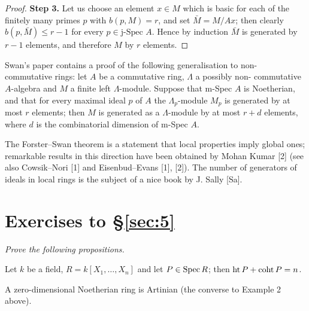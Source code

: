 \begin{proof}
\textbf{Step 3.} Let us choose an element $x \in M$ which is basic for each of the
finitely many primes $p$ with $b(p, M) = r$, and set $\bar{M} = M/Ax$; then clearly
$b(p, \bar{M}) \le r - 1$ for every $p \in \text{j-Spec } A$. Hence by induction $\bar{M}$ is generated by
$r - 1$ elements, and therefore $M$ by $r$ elements.
\end{proof}

Swan's paper contains a proof of the following generalisation to non-
commutative rings: let $A$ be a commutative ring, $\Lambda$ a possibly non-
commutative $A$-algebra and $M$ a finite left $\Lambda$-module. Suppose that
m-Spec $A$ is Noetherian, and that for every maximal ideal $p$ of $A$ the
$\Lambda_p$-module $M_p$ is generated by at most $r$ elements; then $M$ is generated as a
$\Lambda$-module by at most $r + d$ elements, where $d$ is the combinatorial
dimension of m-Spec $A$.

The Forster--Swan theorem is a statement that local properties imply
global ones; remarkable results in this direction have been obtained by
Mohan Kumar [2] (see also Cowsik--Nori [1] and Eisenbud--Evans [1],
[2]). The number of generators of ideals in local rings is the subject of
a nice book by J. Sally [Sa].

\section*{Exercises to \S\ref{sec:5}}
\emph{Prove the following propositions.}

\begin{exercise}\label{ex:5.1-ex}
Let $k$ be a field, $R = k[X_1, \ldots, X_n]$ and let $P \in \operatorname{Spec} R$; then $\operatorname{ht} P +
\operatorname{coht} P = n$.
\end{exercise}

\begin{exercise}\label{ex:5.2-ex}
A zero-dimensional Noetherian ring is Artinian (the converse to Example
2 above).
\end{exercise}
